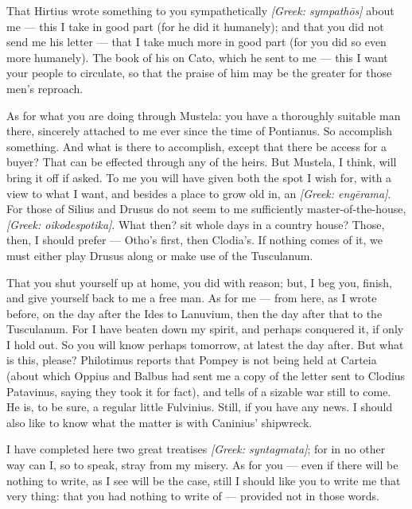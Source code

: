 

 That Hirtius wrote something to you sympathetically \textit{[Greek: sympath\=os]} about me --- this I take in good part (for he did it humanely); and that you did not send me his letter --- that I take much more in good part (for you did so even more humanely). The book of his on Cato, which he sent to me --- this I want your people to circulate, so that the praise of him may be the greater for those men's reproach.

 As for what you are doing through Mustela: you have a thoroughly suitable man there, sincerely attached to me ever since the time of Pontianus. So accomplish something. And what is there to accomplish, except that there be access for a buyer? That can be effected through any of the heirs. But Mustela, I think, will bring it off if asked. To me you will have given both the spot I wish for, with a view to what I want, and besides a place to grow old in, an \textit{[Greek: eng\=erama]}. For those of Silius and Drusus do not seem to me sufficiently master-of-the-house, \textit{[Greek: oikodespotika]}. What then? sit whole days in a country house? Those, then, I should prefer --- Otho's first, then Clodia's. If nothing comes of it, we must either play Drusus along or make use of the Tusculanum.

 That you shut yourself up at home, you did with reason; but, I beg you, finish, and give yourself back to me a free man. As for me --- from here, as I wrote before, on the day after the Ides to Lanuvium, then the day after that to the Tusculanum. For I have beaten down my spirit, and perhaps conquered it, if only I hold out. So you will know perhaps tomorrow, at latest the day after. But what is this, please? Philotimus reports that Pompey is not being held at Carteia (about which Oppius and Balbus had sent me a copy of the letter sent to Clodius Patavinus, saying they took it for fact), and tells of a sizable war still to come. He is, to be sure, a regular little Fulvinius. Still, if you have any news. I should also like to know what the matter is with Caninius' shipwreck.

 I have completed here two great treatises \textit{[Greek: syntagmata]}; for in no other way can I, so to speak, stray from my misery. As for you --- even if there will be nothing to write, as I see will be the case, still I should like you to write me that very thing: that you had nothing to write of --- provided not in those words.
